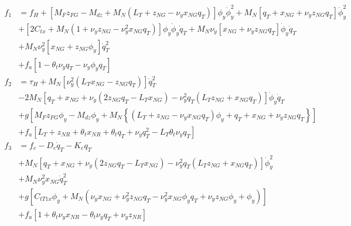 \documentclass[wes, manuscript]{copernicus}
\begin{document}
\begin{align}
f_1&= f_H +
\left[
 M_{F} z_{FG}
- M_{dz}
+ M_N (L_T + z_{NG} - \nu_y x_{NG} q_T)
\right]
\phi_y
\dot{\phi}_y^2 
+
M_N\left[
q_T
+ x_{NG} 
+ \nu_y z_{NG} q_T 
\right]
\dot{\phi}_y^2 
\\
&
+\left[
2 C_{tx}
+
M_N( 1
    + \nu_y z_{NG} 
    - \nu_y^{2} x_{NG} q_T 
    )
\right] \phi_y \dot{\phi}_y \dot{q}_T
+ M_N\nu_y\left[ x_{NG} + \nu_y z_{NG} q_T\right] \dot{\phi}_y \dot{q}_T
\\
&
+ M_N \nu_y^{2} \left[x_{NG} + z_{NG} \phi_y\right]  \dot{q}_T^{2} 
\\
&+f_a\left[1 - \theta_t \nu_y q_T - \nu_y \phi_y q_T \right] 
\\
f_2&= \tau_H  
+M_N \left[
  \nu_y^2(L_T x_{NG}- z_{NG} q_T) 
  \right]
 \dot{q}_T^{2}
  \\
 & -
  2M_N\left[
 q_T + x_{NG} 
 +\nu_y(2 z_{NG} q_T - L_T x_{NG})
 -\nu_y^2q_T(L_T  z_{NG}+ x_{NG} q_T)
 \right]
  \dot{\phi}_y \dot{q}_T 
\\
&
+g \left[
M_{F} z_{FG} \phi_y 
- M_{dz} \phi_y
+ M_N \left\{
(L_T +  z_{NG} -  \nu_y x_{NG}  q_T )\phi_y
+  q_T +  x_{NG} +  \nu_y z_{NG} q_T 
\right\}
\right]
\\
&+f_a \left[L_T + z_{NR} + \theta_t x_{NR} + \theta_t q_T + \nu_y q_T^{2} - L_T \theta_t \nu_y q_T\right]
\\
f_3&= f_e - D_e\dot{q}_T - K_e q_T 
\\
&
+M_N\left[
q_T 
+ x_{NG} 
+\nu_y( 2 z_{NG} q_T - L_T x_{NG})
-\nu_y^2q_T (L_T z_{NG} + x_{NG} q_T)
\right]
\dot{\phi}_y^2
\\
& 
+ M_N \nu_y^{2} x_{NG} \dot{q}_T^2 
\\
&+ g \left[
C_{t T 1x} \phi_y
+   M_N\left(
   \nu_y x_{NG}
+  \nu_y^{2} z_{NG} q_T  
-  \nu_y^{2} x_{NG} \phi_y q_T 
+ \nu_y z_{NG} \phi_y + \phi_y
\right)
\right]
\\
&+f_a\left[ 1+ \theta_t \nu_y x_{NR} - \theta_t \nu_y q_T + \nu_y z_{NR} \right]
\end{align}













\end{document}
